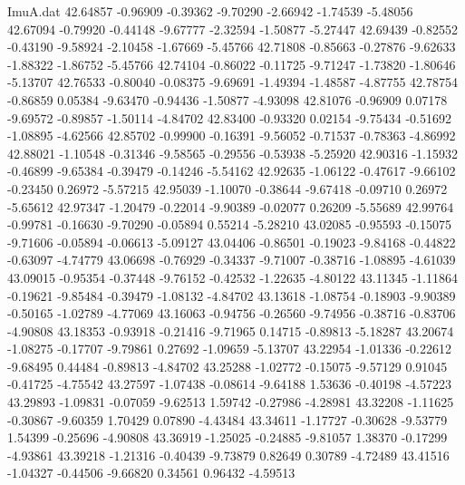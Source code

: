 \begin{filecontents}{ImuA.dat}
  42.64857   -0.96909   -0.39362   -9.70290   -2.66942   -1.74539   -5.48056
  42.67094   -0.79920   -0.44148   -9.67777   -2.32594   -1.50877   -5.27447
  42.69439   -0.82552   -0.43190   -9.58924   -2.10458   -1.67669   -5.45766
  42.71808   -0.85663   -0.27876   -9.62633   -1.88322   -1.86752   -5.45766
  42.74104   -0.86022   -0.11725   -9.71247   -1.73820   -1.80646   -5.13707
  42.76533   -0.80040   -0.08375   -9.69691   -1.49394   -1.48587   -4.87755
  42.78754   -0.86859    0.05384   -9.63470   -0.94436   -1.50877   -4.93098
  42.81076   -0.96909    0.07178   -9.69572   -0.89857   -1.50114   -4.84702
  42.83400   -0.93320    0.02154   -9.75434   -0.51692   -1.08895   -4.62566
  42.85702   -0.99900   -0.16391   -9.56052   -0.71537   -0.78363   -4.86992
  42.88021   -1.10548   -0.31346   -9.58565   -0.29556   -0.53938   -5.25920
  42.90316   -1.15932   -0.46899   -9.65384   -0.39479   -0.14246   -5.54162
  42.92635   -1.06122   -0.47617   -9.66102   -0.23450    0.26972   -5.57215
  42.95039   -1.10070   -0.38644   -9.67418   -0.09710    0.26972   -5.65612
  42.97347   -1.20479   -0.22014   -9.90389   -0.02077    0.26209   -5.55689
  42.99764   -0.99781   -0.16630   -9.70290   -0.05894    0.55214   -5.28210
  43.02085   -0.95593   -0.15075   -9.71606   -0.05894   -0.06613   -5.09127
  43.04406   -0.86501   -0.19023   -9.84168   -0.44822   -0.63097   -4.74779
  43.06698   -0.76929   -0.34337   -9.71007   -0.38716   -1.08895   -4.61039
  43.09015   -0.95354   -0.37448   -9.76152   -0.42532   -1.22635   -4.80122
  43.11345   -1.11864   -0.19621   -9.85484   -0.39479   -1.08132   -4.84702
  43.13618   -1.08754   -0.18903   -9.90389   -0.50165   -1.02789   -4.77069
  43.16063   -0.94756   -0.26560   -9.74956   -0.38716   -0.83706   -4.90808
  43.18353   -0.93918   -0.21416   -9.71965    0.14715   -0.89813   -5.18287
  43.20674   -1.08275   -0.17707   -9.79861    0.27692   -1.09659   -5.13707
  43.22954   -1.01336   -0.22612   -9.68495    0.44484   -0.89813   -4.84702
  43.25288   -1.02772   -0.15075   -9.57129    0.91045   -0.41725   -4.75542
  43.27597   -1.07438   -0.08614   -9.64188    1.53636   -0.40198   -4.57223
  43.29893   -1.09831   -0.07059   -9.62513    1.59742   -0.27986   -4.28981
  43.32208   -1.11625   -0.30867   -9.60359    1.70429    0.07890   -4.43484
  43.34611   -1.17727   -0.30628   -9.53779    1.54399   -0.25696   -4.90808
  43.36919   -1.25025   -0.24885   -9.81057    1.38370   -0.17299   -4.93861
  43.39218   -1.21316   -0.40439   -9.73879    0.82649    0.30789   -4.72489
  43.41516   -1.04327   -0.44506   -9.66820    0.34561    0.96432   -4.59513

\end{filecontents}
